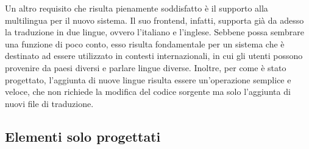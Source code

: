 Un altro requisito che risulta pienamente soddisfatto è il supporto alla multilingua per il nuovo sistema. Il suo frontend, infatti, supporta già da adesso la traduzione in due lingue, ovvero l'italiano e l'inglese. Sebbene possa sembrare una funzione di poco conto, esso risulta fondamentale per un sistema che è destinato ad essere utilizzato in contesti internazionali, in cui gli utenti possono provenire da paesi diversi e parlare lingue diverse. Inoltre, per come è stato progettato, l'aggiunta di nuove lingue risulta essere un'operazione semplice e veloce, che non richiede la modifica del codice sorgente ma solo l'aggiunta di nuovi file di traduzione.

\subsection{Elementi solo progettati}
